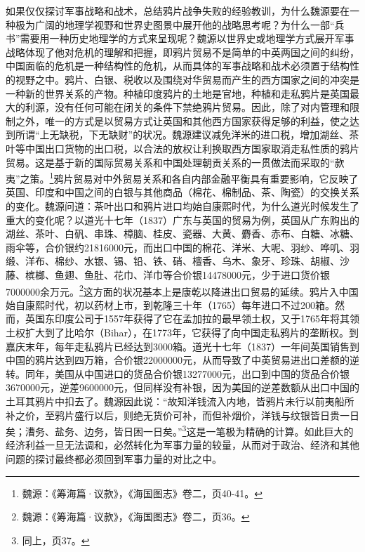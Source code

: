 \documentclass[a4paper, 12pt, openright]{ctexbook}
\begin{document}
如果仅仅探讨军事战略和战术，总结鸦片战争失败的经验教训，为什么魏源要在一种极为广阔的地理学视野和世界史图景中展开他的战略思考呢？为什么一部“兵书”需要用一种历史地理学的方式来呈现呢？魏源以世界史或地理学方式展开军事战略体现了他对危机的理解和把握，即鸦片贸易不是简单的中英两国之间的纠纷，中国面临的危机是一种结构性的危机，从而具体的军事战略和战术必须置于结构性的视野之中。鸦片、白银、税收以及围绕对华贸易而产生的西方国家之间的冲突是一种新的世界关系的产物。种植印度鸦片的土地是官地，种植和走私鸦片是英国最大的利源，没有任何可能在闭关的条件下禁绝鸦片贸易。因此，除了对内管理和限制之外，唯一的方式是以贸易方式让英国和其他西方国家获得足够的利益，使之达到所谓“上无缺税，下无缺财”的状况。魏源建议减免洋米的进口税，增加湖丝、茶叶等中国出口货物的出口税，以合法的放权让利换取西方国家取消走私性质的鸦片贸易。这是基于新的国际贸易关系和中国处理朝贡关系的一贯做法而采取的“款夷”之策。\footnote{魏源：《筹海篇·议款》，《海国图志》卷二，页40-41。}鸦片贸易对中外贸易关系和各自内部金融平衡具有重要影响，它反映了英国、印度和中国之间的白银与其他商品（棉花、棉制品、茶、陶瓷）的交换关系的变化。魏源问道：茶叶出口和鸦片进口均始自康熙时代，为什么道光时候发生了重大的变化呢？以道光十七年（1837）广东与英国的贸易为例，英国从广东购出的湖丝、茶叶、白矾、串珠、樟脑、桂皮、瓷器、大黄、麝香、赤布、白糖、冰糖、雨伞等，合价银约21816000元，而出口中国的棉花、洋米、大呢、羽纱、哗叽、羽缎、洋布、棉纱、水银、锡、铅、铁、硝、檀香、乌木、象牙、珍珠、胡椒、沙藤、槟榔、鱼翅、鱼肚、花巾、洋巾等合价银14478000元，少于进口货价银7000000余万元。\footnote{魏源：《筹海篇·议款》，《海国图志》卷二，页36。}这方面的状况基本上是康乾以降进出口贸易的延续。鸦片入中国始自康熙时代，初以药材上市，到乾隆三十年（1765）每年进口不过200箱。然而，英国东印度公司于1557年获得了它在孟加拉的最早领土权，又于1765年将其领土权扩大到了比哈尔（Bihar），在1773年，它获得了向中国走私鸦片的垄断权。到嘉庆末年，每年走私鸦片已经达到3000箱。道光十七年（1837）一年间英国销售到中国的鸦片达到四万箱，合价银22000000元，从而导致了中英贸易进出口差额的逆转。同年，美国从中国进口的货品合价银13277000元，出口到中国的货品合价银3670000元，逆差9600000元，但同样没有补银，因为美国的逆差数额从出口中国的土耳其鸦片中扣去了。魏源因此说：“故知洋钱流入内地，皆鸦片未行以前夷船所补之价，至鸦片盛行以后，则绝无货价可补，而但补烟价，洋钱与纹银皆日贵一日矣；漕务、盐务、边务，皆日困一日矣。”\footnote{同上，页37。}这是一笔极为精确的计算。如此巨大的经济利益一旦无法调和，必然转化为军事力量的较量，从而对于政治、经济和其他问题的探讨最终都必须回到军事力量的对比之中。
\end{document}
